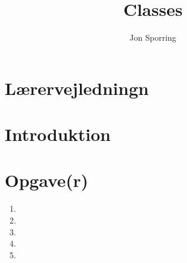 \documentclass[a4paper,12pt]{article}
\title{Classes}
\author{Jon Sporring}
\begin{document}
\maketitle

\section{Lærervejledningn}

\section{Introduktion}

\section{Opgave(r)}
\begin{enumerate}
\item 
\item 
\item 
\item 
\item 
\end{enumerate}
\end{document}
